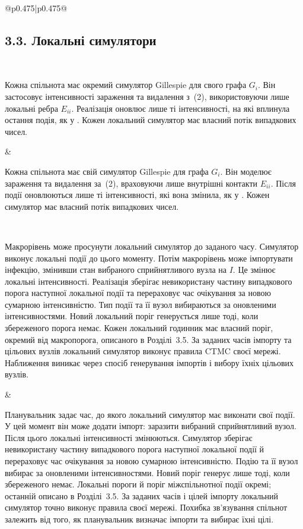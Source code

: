 ﻿\documentclass[11pt]{article}
\begin{document}
\begin{longtable}{@{}p{0.475\textwidth}|p{0.475\textwidth}@{}}
\begin{minipage}[t]{\linewidth}
\subsection*{3.3. Локальні симулятори}
\end{minipage} \\[5mm]
\begin{minipage}[t]{\linewidth}
Кожна спільнота має окремий симулятор Gillespie для свого графа $G_i$. Він застосовує інтенсивності зараження та видалення з~(2), використовуючи лише локальні ребра $E_{ii}$. Реалізація оновлює лише ті інтенсивності, на які вплинула остання подія, як у \citet{kuryliak2025simulating}. Кожен локальний симулятор має власний потік випадкових чисел.
\end{minipage} &
\begin{minipage}[t]{\linewidth}
Кожна спільнота має свій симулятор Gillespie для графа $G_i$. Він моделює зараження та видалення за~(2), враховуючи лише внутрішні контакти $E_{ii}$. Після події оновлюються лише ті інтенсивності, які вона змінила, як у \citet{kuryliak2025simulating}. Кожен симулятор має власний потік випадкових чисел.
\end{minipage} \\[5mm]
\begin{minipage}[t]{\linewidth}
Макрорівень може просунути локальний симулятор до заданого часу. Симулятор виконує локальні події до цього моменту. Потім макрорівень може імпортувати інфекцію, змінивши стан вибраного сприйнятливого вузла на $I$. Це змінює локальні інтенсивності. Реалізація зберігає невикористану частину випадкового порога наступної локальної події та перераховує час очікування за новою сумарною інтенсивністю. Тип події та її вузол вибираються за оновленими інтенсивностями. Новий локальний поріг генерується лише тоді, коли збереженого порога немає. Кожен локальний годинник має власний поріг, окремий від макропорога, описаного в Розділі~3.5. За заданих часів імпорту та цільових вузлів локальний симулятор виконує правила CTMC своєї мережі. Наближення виникає через спосіб генерування імпортів і вибору їхніх цільових вузлів.
\end{minipage} &
\begin{minipage}[t]{\linewidth}
Планувальник задає час, до якого локальний симулятор має виконати свої події. У цей момент він може додати імпорт: заразити вибраний сприйнятливий вузол. Після цього локальні інтенсивності змінюються. Симулятор зберігає невикористану частину випадкового порога наступної локальної події й перераховує час очікування за новою сумарною інтенсивністю. Подію та її вузол вибирає за оновленими інтенсивностями. Новий поріг генерує лише тоді, коли збереженого немає. Локальні пороги й поріг міжспільнотної події окремі; останній описано в Розділі~3.5. За заданих часів і цілей імпорту локальний симулятор точно виконує правила своєї мережі. Похибка зв'язування спільнот залежить від того, як планувальник визначає імпорти та вибирає їхні цілі.
\end{minipage} \\[5mm]
\begin{minipage}[t]{\linewidth}

\end{minipage}
\end{longtable}
\end{document}
